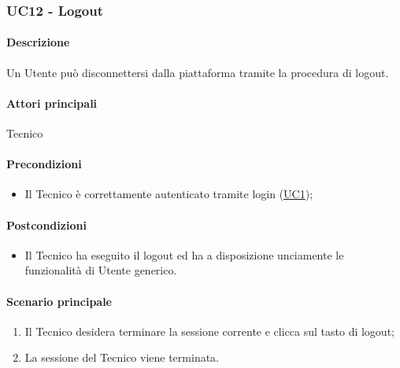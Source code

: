 \subsubsection{UC12 - Logout}\label{UC12}
\paragraph*{Descrizione}
Un Utente può disconnettersi dalla piattaforma tramite la procedura di logout.

\paragraph*{Attori principali}
Tecnico

\paragraph*{Precondizioni}
\begin{itemize}
  \item Il Tecnico è correttamente autenticato tramite login (\hyperref[UC1]{UC1});
\end{itemize}

\paragraph*{Postcondizioni}
\begin{itemize}
  \item Il Tecnico ha eseguito il logout ed ha a disposizione unciamente le funzionalità di Utente generico.
\end{itemize}

\paragraph*{Scenario principale}
\begin{enumerate}
  \item Il Tecnico desidera terminare la sessione corrente e clicca sul tasto di logout;
  \item La sessione del Tecnico viene terminata.  
\end{enumerate}
